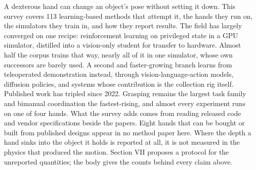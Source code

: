 A dexterous hand can change an object's pose without setting it down. This survey covers 113
learning-based methods that attempt it, the hands they run on, the simulators they train in,
and how they report results. The field has largely converged on one recipe: reinforcement
learning on privileged state in a GPU simulator, distilled into a vision-only student for
transfer to hardware. Almost half the corpus trains that way, nearly all of it in one
simulator, whose own successors are barely used. A second and faster-growing branch learns from
teleoperated demonstration instead, through vision-language-action models, diffusion policies,
and systems whose contribution is the collection rig itself. Published work has tripled since
2022. Grasping remains the largest task family and bimanual coordination the fastest-rising,
and almost every experiment runs on one of four hands. What the survey adds comes from reading
released code and vendor specifications beside the papers. Eight hands that can be bought or
built from published designs appear in no method paper here. Where the depth a hand sinks into the object it holds is reported at all, it is not measured in the physics that produced the motion. Section VII proposes a protocol for the unreported quantities; the body
gives the counts behind every claim above.
